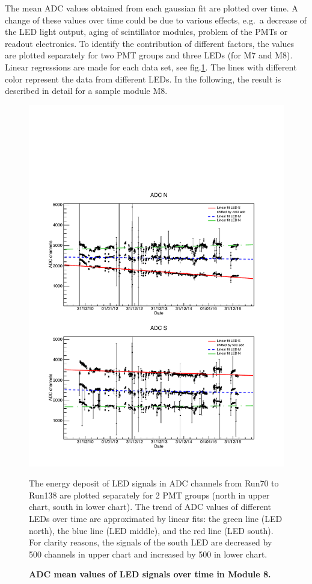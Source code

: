 The mean ADC values obtained from each gaussian fit are plotted over time. A change of these values over time could be due to various effects, e.g.\ a decrease of the LED light output, aging of scintillator modules, problem of the PMTs or readout electronics. To identify the contribution of different factors, the values are plotted separately for two PMT groups and three LEDs (for M7 and M8). Linear regressions are made for each data set, see fig.\ref{fig:M8LED}. The lines with different color represent the data from different LEDs. In the following, the result is described in detail for a sample module M8.

\begin{figure}[htbp]
  \centering
  \includegraphics[width=\textwidth{}]{./fig/M8LED.pdf}
  \caption{\textbf{ADC mean values of LED signals over time in Module 8.}} The energy deposit of LED signals in ADC channels from Run70 to Run138 are plotted separately for 2 PMT groups (north in upper chart, south in lower chart). The trend of ADC values of different LEDs over time are approximated by linear fits: the green line (LED north), the blue line (LED middle), and the red line (LED south). For clarity reasons, the signals of the south LED are decreased by 500 channels in upper chart and increased by 500 in lower chart.
  \label{fig:M8LED}
\end{figure}

